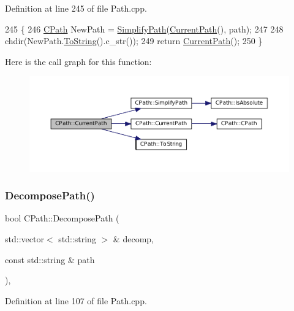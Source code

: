 Definition at line 245 of file Path.\+cpp.


\begin{DoxyCode}
245                                          \{
246     \hyperlink{classCPath}{CPath} NewPath = \hyperlink{classCPath_af0213a2ea0de0498ded236137e759922}{SimplifyPath}(\hyperlink{classCPath_a5161b834e754b217ddead2437eaaa223}{CurrentPath}(), path);
247     
248     chdir(NewPath.\hyperlink{classCPath_abbafaf377a7e38e0151bd9567d526951}{ToString}().c\_str());
249     \textcolor{keywordflow}{return} \hyperlink{classCPath_a5161b834e754b217ddead2437eaaa223}{CurrentPath}();
250 \}
\end{DoxyCode}
Here is the call graph for this function\+:\nopagebreak
\begin{figure}[H]
\begin{center}
\leavevmode
\includegraphics[width=350pt]{classCPath_a87ec01e5af0eb4e2184caf1d9ecc8892_cgraph}
\end{center}
\end{figure}
\hypertarget{classCPath_aae05f3c3502e92bf68d5ce71264c7bb9}{}\label{classCPath_aae05f3c3502e92bf68d5ce71264c7bb9} 
\subsubsection{\texorpdfstring{Decompose\+Path()}{DecomposePath()}}
{\footnotesize\ttfamily bool C\+Path\+::\+Decompose\+Path (\begin{DoxyParamCaption}\item[{std\+::vector$<$ std\+::string $>$ \&}]{decomp,  }\item[{const std\+::string \&}]{path }\end{DoxyParamCaption})\hspace{0.3cm}{\ttfamily [static]}, {\ttfamily [protected]}}



Definition at line 107 of file Path.\+cpp.


